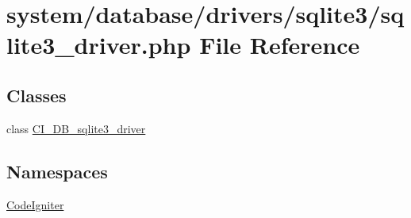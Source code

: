 \hypertarget{sqlite3__driver_8php}{}\section{system/database/drivers/sqlite3/sqlite3\+\_\+driver.php File Reference}
\label{sqlite3__driver_8php}
\subsection*{Classes}
\begin{DoxyCompactItemize}
\item 
class \mbox{\hyperlink{class_c_i___d_b__sqlite3__driver}{C\+I\+\_\+\+D\+B\+\_\+sqlite3\+\_\+driver}}
\end{DoxyCompactItemize}
\subsection*{Namespaces}
\begin{DoxyCompactItemize}
\item 
 \mbox{\hyperlink{namespace_code_igniter}{Code\+Igniter}}
\end{DoxyCompactItemize}
